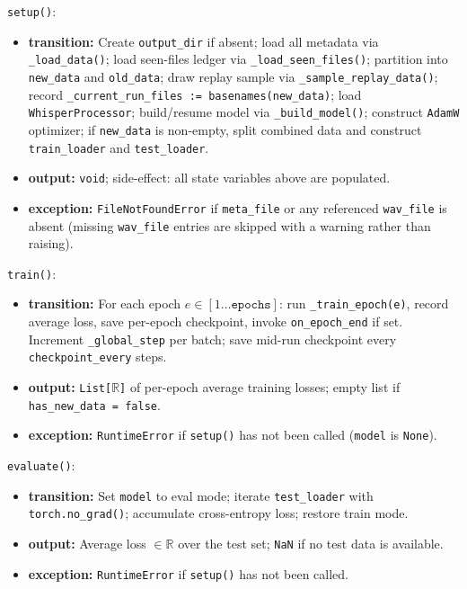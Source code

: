 \documentclass[12pt, titlepage]{article}
\begin{document}
\noindent\texttt{setup()}:
\begin{itemize}
  \item \textbf{transition:} Create \texttt{output\_dir} if absent; load all metadata via \texttt{\_load\_data()}; load seen-files ledger via \texttt{\_load\_seen\_files()}; partition into \texttt{new\_data} and \texttt{old\_data}; draw replay sample via \texttt{\_sample\_replay\_data()}; record \texttt{\_current\_run\_files := basenames(new\_data)}; load \texttt{WhisperProcessor}; build/resume model via \texttt{\_build\_model()}; construct \texttt{AdamW} optimizer; if \texttt{new\_data} is non-empty, split combined data and construct \texttt{train\_loader} and \texttt{test\_loader}.
  \item \textbf{output:} \texttt{void}; side-effect: all state variables above are populated.
  \item \textbf{exception:} \texttt{FileNotFoundError} if \texttt{meta\_file} or any referenced \texttt{wav\_file} is absent (missing \texttt{wav\_file} entries are skipped with a warning rather than raising).
\end{itemize}



\noindent\texttt{train()}:
\begin{itemize}
  \item \textbf{transition:} For each epoch $e \in [1 \ldots \texttt{epochs}]$: run \texttt{\_train\_epoch(e)}, record average loss, save per-epoch checkpoint, invoke \texttt{on\_epoch\_end} if set. Increment \texttt{\_global\_step} per batch; save mid-run checkpoint every \texttt{checkpoint\_every} steps.
  \item \textbf{output:} \texttt{List[$\mathbb{R}$]} of per-epoch average training losses; empty list if \texttt{has\_new\_data = false}.
  \item \textbf{exception:} \texttt{RuntimeError} if \texttt{setup()} has not been called (\texttt{model} is \texttt{None}).
\end{itemize}

\noindent\texttt{evaluate()}:
\begin{itemize}
  \item \textbf{transition:} Set \texttt{model} to eval mode; iterate \texttt{test\_loader} with \texttt{torch.no\_grad()}; accumulate cross-entropy loss; restore train mode.
  \item \textbf{output:} Average loss $\in \mathbb{R}$ over the test set; \texttt{NaN} if no test data is available.
  \item \textbf{exception:} \texttt{RuntimeError} if \texttt{setup()} has not been called.
\end{itemize}
\end{document}
